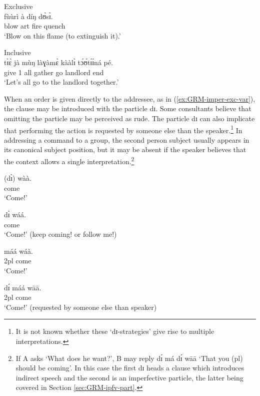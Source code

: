 \ea\label{ex:GRM-imperative-exc-inc}
\ea\label{ex:GRM-imperative-exc}{\rm Exclusive}\\
\gll fùùrì à díŋ dʊ̀sɪ̀.\\
blow {\sc art} fire quench\\
\glt `Blow on this flame (to extinguish it).'

\ex\label{ex:GRM-imperative-inc}{\rm Inclusive}\\
\gll tɪ̀ɛ̀ jà mùŋ làɣàmɛ̀ kààlɪ̀ tɔ́ʊ́tɪ́ɪ́ná  pé.\\
give {1\pl} all gather go landlord end\\
\glt `Let's all go to the landlord  together.'

\z
\z

When an order is given directly to the addressee, as in 
(\ref{ex:GRM-imper-exc-var}), the clause may be introduced with the particle 
{\sls dɪ}. Some consultants believe that omitting the particle may be perceived 
as rude.  The particle {\sls dɪ} can also implicate that performing 
the action is requested by someone else than the speaker.\footnote{It is not 
known whether these `{\sls dɪ}-strategies' give rise to multiple 
interpretations.}  In addressing a command to a group, the second person  
subject   usually appears in its canonical subject position, but it may 
be absent if the speaker believes that the context allows a single 
interpretation.\footnote{If A asks `What does he want?', B may reply {\sls dɪ́  
má dɪ́ wāā} `That you ({\sc pl}) should be coming'. In this case the first 
{\sls dɪ} heads a  clause which introduces indirect speech and the second is an 
imperfective particle,  the latter being covered in Section 
\ref{sec:GRM-ipfv-part}. }


\begin{multicols}{2}
 

\ea\label{ex:GRM-imper-exc-var}
\ea\label{ex:GRM-imper-exc-var-sg}
\gll (dɪ̀)  wàà.\\
 {\comp} come\\
\glt `Come!'

\ex 
\gll dɪ̀ wáá.\\
 {\comp} come\\
 \glt `Come!' (keep coming! or follow me!)
 
\ex 
\gll máá wáà.\\
 {\sc 2pl} come\\
\glt `Come!'

\ex\label{ex:GRM-imper-exc-var-out}  
\gll dɪ́ máá wāā.\\
 {\comp}  {\sc 2pl}  come\\
\glt `Come!' (requested by someone else than speaker)
\z
\z

\end{multicols}

